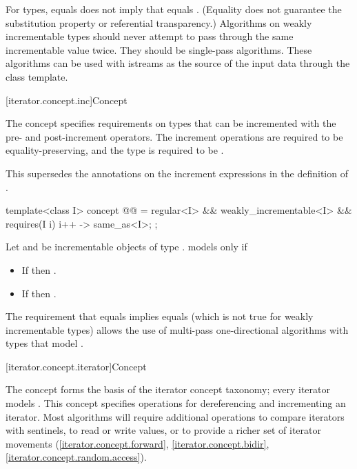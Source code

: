 \pnum
\begin{note}
For  types,  equals  does not imply that 
equals . (Equality does not guarantee the substitution property or referential
transparency.) Algorithms on weakly incrementable types should never attempt to pass
through the same incrementable value twice. They should be single-pass algorithms. These algorithms
can be used with istreams as the source of the input data through the  class
template.
\end{note}

[iterator.concept.inc]{Concept }

\pnum
The  concept specifies requirements on types that can be incremented with the pre-
and post-increment operators. The increment operations are required to be equality-preserving,
and the type is required to be .
\begin{note}
This supersedes the annotations on the increment expressions
in the definition of .
\end{note}

\begin{codeblock}
template<class I>
  concept @@ =
    regular<I> &&
    weakly_incrementable<I> &&
    requires(I i) {
      { i++ } -> same_as<I>;
    };
\end{codeblock}

\pnum
Let  and  be incrementable objects of type .
 models  only if
\begin{itemize}
\item If  then .
\item If  then .
\end{itemize}

\pnum
\begin{note}
The requirement that
 equals 
implies
 equals 
(which is not true for weakly incrementable types)
allows the use of multi-pass one-directional
algorithms with types that model .
\end{note}

[iterator.concept.iterator]{Concept }

\pnum
The  concept forms the basis
of the iterator concept taxonomy; every iterator models .
This concept specifies operations for dereferencing and incrementing
an iterator. Most algorithms will require additional operations
to compare iterators with sentinels, to
read or write values, or
to provide a richer set of iterator movements (\ref{iterator.concept.forward},
\ref{iterator.concept.bidir}, \ref{iterator.concept.random.access}).


